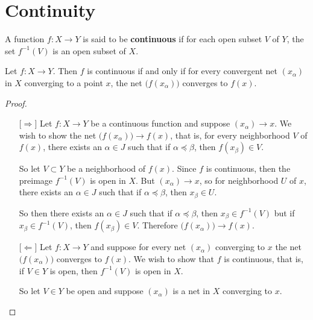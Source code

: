 \documentclass[12pt]{article}
\begin{document}
\section{Continuity}
\begin{defn}
    A function $f : X \to Y$ is said to be \textbf{continuous} if for each open subset $V$ of $Y$,
    the set $f^{-1}(V)$ is an open subset of $X$.
\end{defn}
\begin{thm}
    Let $f: X \to Y$. Then $f$ is continuous if and only if for every convergent net $(x_\alpha)$
    in $X$ converging to a point $x$, the net $\big(f(x_\alpha)\big)$ converges to $f(x)$.
\end{thm}
\begin{proof}
    \ \vspace{-0.5cm}\newline
    \begin{itemize}
        \item[$\lbrack\Rightarrow\rbrack$] Let $f: X \to Y$ be a continuous function and suppose
              $(x_\alpha) \to x$. We wish to show the net $\big(f(x_\alpha)\big) \to f(x)$, that
              is, for every neighborhood $V$ of $f(x)$, there exists an $\alpha \in J$ such that
              if $\alpha \preceq \beta$, then $f(x_\beta) \in V$.

              So let $V \subset Y$ be a neighborhood of $f(x)$. Since $f$ is continuous, then the
              preimage $f^{-1}(V)$ is open in $X$. But $(x_\alpha) \to x$, so for
              neighborhood $U$ of $x$, there exists an $\alpha \in J$ such that if
              $\alpha \preceq \beta$, then $x_\beta \in U$.

              So then there exists an $\alpha \in J$ such that if $\alpha \preceq \beta$, then
              $x_\beta \in f^{-1}(V)$ but if $x_\beta \in f^{-1}(V)$, then $f(x_\beta) \in V$.
              Therefore $\big(f(x_\alpha)\big) \to f(x)$.
        \item[$\lbrack\Leftarrow\rbrack$] Let $f: X \to Y$ and suppose for every net $(x_\alpha)$
              converging to $x$ the net $\big(f(x_\alpha)\big)$ converges to $f(x)$. We wish to
              show that $f$ is continuous, that is, if $V \in Y$ is open, then $f^{-1}(V)$ is open
              in $X$.

              So let $V \in Y$ be open and suppose $(x_\alpha)$ is a net in $X$ converging to $x$.
    \end{itemize}
\end{proof}
\end{document}
